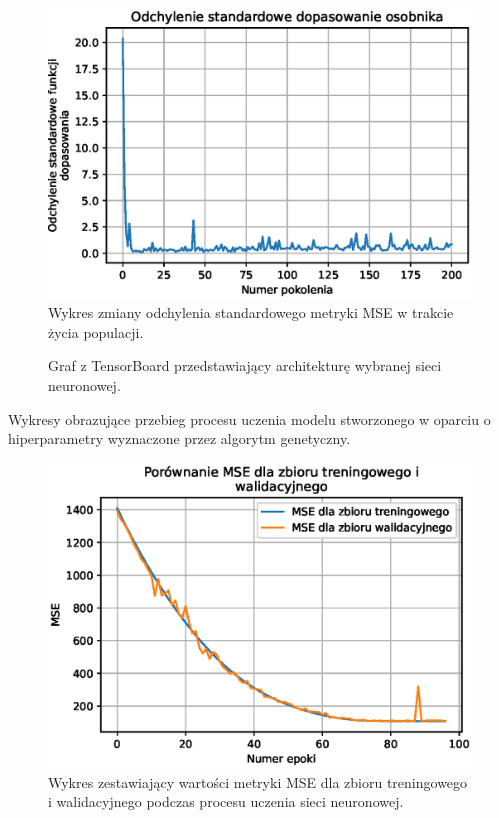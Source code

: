\documentclass[a4paper,11pt]{article}
\begin{document}
    \begin{figure}[H]
        \label{fig:g_a_fitness_standard_deviation}
        \centering
        \includegraphics[width=\textwidth]{g_a_fitness_standard_deviation}
        \caption{Wykres zmiany odchylenia standardowego metryki MSE w trakcie życia populacji.}
    \end{figure}

    \bigskip

    \begin{figure}[H]
        \label{fig:tensorboard_graph}
        \centering
        \caption{Graf z TensorBoard przedstawiający architekturę wybranej sieci neuronowej.}
    \end{figure}

    \bigskip

    Wykresy obrazujące przebieg procesu uczenia modelu stworzonego w oparciu o hiperparametry wyznaczone przez algorytm genetyczny.

    \begin{figure}[H]
        \label{fig:f_m_mse_train_valid}
        \centering
        \includegraphics[width=\textwidth]{f_m_mse_train_valid}
        \caption{Wykres zestawiający wartości metryki MSE dla zbioru treningowego i walidacyjnego podczas procesu uczenia sieci neuronowej.}
    \end{figure}
\end{document}
